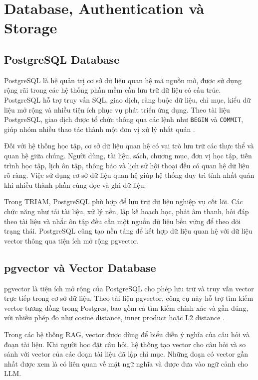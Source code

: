 \documentclass[12pt,a4paper]{report}
\begin{document}
\section{Database, Authentication và Storage}

\subsection{PostgreSQL Database}

PostgreSQL là hệ quản trị cơ sở dữ liệu quan hệ mã nguồn mở, được sử dụng rộng rãi trong các hệ thống phần mềm cần lưu trữ dữ liệu có cấu trúc. PostgreSQL hỗ trợ truy vấn SQL, giao dịch, ràng buộc dữ liệu, chỉ mục, kiểu dữ liệu mở rộng và nhiều tiện ích phục vụ phát triển ứng dụng. Theo tài liệu PostgreSQL, giao dịch được tổ chức thông qua các lệnh như \texttt{BEGIN} và \texttt{COMMIT}, giúp nhóm nhiều thao tác thành một đơn vị xử lý nhất quán \cite{postgresTransactionsDocs}.

Đối với hệ thống học tập, cơ sở dữ liệu quan hệ có vai trò lưu trữ các thực thể và quan hệ giữa chúng. Người dùng, tài liệu, sách, chương mục, đơn vị học tập, tiến trình học tập, lịch ôn tập, thông báo và lịch sử hội thoại đều có quan hệ dữ liệu rõ ràng. Việc sử dụng cơ sở dữ liệu quan hệ giúp hệ thống duy trì tính nhất quán khi nhiều thành phần cùng đọc và ghi dữ liệu.

Trong TRIAM, PostgreSQL phù hợp để lưu trữ dữ liệu nghiệp vụ cốt lõi. Các chức năng như tải tài liệu, xử lý nền, lập kế hoạch học, phát âm thanh, hỏi đáp theo tài liệu và nhắc ôn tập đều cần một nguồn dữ liệu bền vững để theo dõi trạng thái. PostgreSQL cũng tạo nền tảng để kết hợp dữ liệu quan hệ với dữ liệu vector thông qua tiện ích mở rộng pgvector.

\subsection{pgvector và Vector Database}

pgvector là tiện ích mở rộng của PostgreSQL cho phép lưu trữ và truy vấn vector trực tiếp trong cơ sở dữ liệu. Theo tài liệu pgvector, công cụ này hỗ trợ tìm kiếm vector tương đồng trong Postgres, bao gồm cả tìm kiếm chính xác và gần đúng, với nhiều phép đo như cosine distance, inner product hoặc L2 distance \cite{pgvectorDocs}.

Trong các hệ thống RAG, vector được dùng để biểu diễn ý nghĩa của câu hỏi và đoạn tài liệu. Khi người học đặt câu hỏi, hệ thống tạo vector cho câu hỏi và so sánh với vector của các đoạn tài liệu đã lập chỉ mục. Những đoạn có vector gần nhất được xem là có liên quan về mặt ngữ nghĩa và được đưa vào ngữ cảnh cho LLM.
\end{document}
